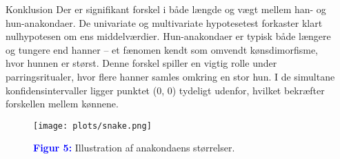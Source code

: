 \documentclass[final]{beamer}
\newlength{\sepwidth}
\newlength{\colwidth}
\newcommand{\separatorcolumn}{\begin{column}{\sepwidth}\end{column}}
\begin{document}
\begin{frame}[t]
\begin{columns}[t]
\begin{column}{\colwidth}
\begin{block}{Konklusion}
Der er signifikant forskel i både længde og vægt mellem han- og hun-anakondaer. De univariate og multivariate hypotesetest forkaster klart nulhypotesen om ens middelværdier. Hun-anakondaer er typisk både længere og tungere end hanner – et fænomen kendt som omvendt kønsdimorfisme, hvor hunnen er størst. Denne forskel spiller en vigtig rolle under parringsritualer, hvor flere hanner samles omkring en stor hun. I de simultane konfidensintervaller ligger punktet (0, 0) tydeligt udenfor, hvilket bekræfter forskellen mellem kønnene.

\end{block}


  	\vspace{-1em} 
  	\begin{figure}[h!]
		\centering
		\texttt{[image: plots/snake.png]}
  		
		\textbf{\textcolor{blue}{Figur 5:}} Illustration af anakondaens størrelser.
	\end{figure}

\end{column}

\separatorcolumn
\end{columns}
\end{frame}
\end{document}
